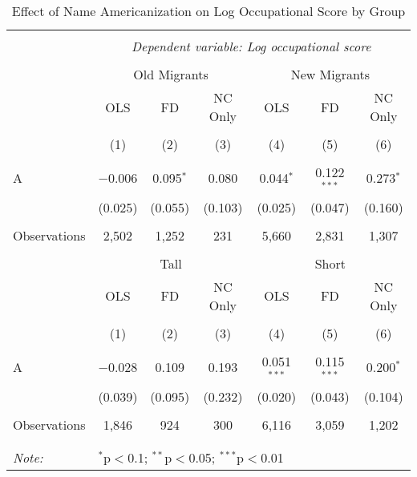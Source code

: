 \begin{table}[H] \centering 
	  \caption{Effect of Name Americanization on Log Occupational Score by Group} 
  \label{tab:table4} 
\begin{tabular}{@{\extracolsep{5pt}}lcccccc} 
\\[-1.8ex]\hline 
\hline \\[-1.8ex] 
 & \multicolumn{6}{c}{\textit{Dependent variable: Log occupational score}} \\ 
\cline{2-7} 
\\[-1.8ex] & \multicolumn{3}{c}{Old Migrants} & \multicolumn{3}{c}{New Migrants} \\ \cmidrule(lr){2-4} \cmidrule(lr){5-7}
& OLS & FD &  NC Only &  OLS &  FD &  NC Only \\  
\\[-1.8ex] & (1) & (2) & (3) & (4) & (5) & (6)\\ 
\hline \\[-1.8ex] 
 A & $-$0.006 & 0.095$^{*}$ & 0.080 & 0.044$^{*}$ & 0.122$^{***}$ & 0.273$^{*}$ \\ 
  & (0.025) & (0.055) & (0.103) & (0.025) & (0.047) & (0.160) \\ 
  & & & & & & \\ 
Observations & 2,502 & 1,252 & 231 & 5,660 & 2,831 & 1,307 \\ 
\hline 
\\[-1.8ex] & \multicolumn{3}{c}{Tall} & \multicolumn{3}{c}{Short} \\ \cmidrule(lr){2-4} \cmidrule(lr){5-7}
& OLS & FD &  NC Only &  OLS &  FD &  NC Only \\  
\\[-1.8ex] & (1) & (2) & (3) & (4) & (5) & (6)\\ 
\hline \\[-1.8ex] 
 A & $-$0.028 & 0.109 & 0.193 & 0.051$^{***}$ & 0.115$^{***}$ & 0.200$^{*}$ \\ 
& (0.039) & (0.095) & (0.232) & (0.020) & (0.043) & (0.104) \\ 
& & & & & & \\ 

Observations & 1,846 & 924 & 300 & 6,116 & 3,059 & 1,202 \\ 
& & & & & & \\ 

\hline \\[-1.8ex] 
\textit{Note:}  & \multicolumn{6}{l}{$^{*}$p$<$0.1; $^{**}$p$<$0.05; $^{***}$p$<$0.01} \\ 
\end{tabular} 
\end{table} 